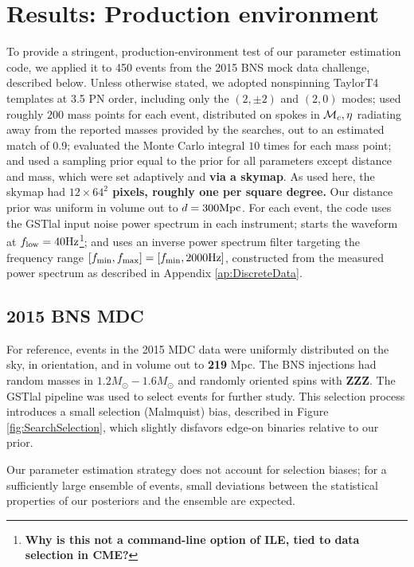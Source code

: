 \documentclass[twocolumn,prd,nofootinbib]{revtex4}
\newcommand\unit[1]{{\rm #1}}
\newcommand\mc{{{\cal M}_c}}
\newcommand\nEventsMDC{450}
\newcommand\gstlal{{\sc GSTlal}}
\begin{document}
\section{Results: Production environment}

To provide a stringent, production-environment test of our parameter estimation code, we applied it to \nEventsMDC{}
events from the 2015 BNS mock data challenge, described below.  
%
Unless otherwise stated, we adopted nonspinning TaylorT4 templates at 3.5 PN order, including only the $(2,\pm 2)$ and
$(2,0)$ modes;  used roughly $200$ mass points for each event, distributed on spokes in $\mc,\eta$ radiating away from the reported
masses  provided by the searches, out to an estimated match of 0.9; 
 evaluated the Monte Carlo integral $10$ times for each mass point; and used a sampling prior equal to the prior for all
 parameters except distance and mass, which were set adaptively and \textbf{via a skymap}.    As used here, the skymap had
 \textbf{$12\times 64^2$ pixels, roughly one per square degree.}  Our distance prior was
 uniform in volume out to $d=300\unit{Mpc}$.  
For each event, the code uses the \gstlal{} input noise power spectrum in each instrument; starts the waveform at $f_{\rm
  low}=40\unit{Hz}$\footnote{ \textbf{Why is this not a command-line option of ILE, tied to data selection in CME?}};
and uses an inverse power spectrum filter targeting the frequency range $[f_{\rm min},f_{\rm max}]=[f_{\rm min},
  2000\unit{Hz}]$, constructed from the measured power spectrum as described in Appendix \ref{ap:DiscreteData}.  

\subsection{2015 BNS MDC}


For reference, events in the 2015 MDC data were uniformly distributed on the sky, in orientation, and in volume out to
\textbf{219} \unit{Mpc}.  The BNS injections had random masses in $1.2 M_\odot-1.6 M_\odot$ and randomly oriented spins with
\textbf{ZZZ}.   The \gstlal{} pipeline was used to select events for further study.  This selection process introduces a
small selection (Malmquist) bias, described in Figure \ref{fig:SearchSelection}, 
which slightly disfavors edge-on binaries relative to our prior.    
%

Our parameter estimation strategy does not account for selection biases; for a sufficiently large ensemble of events,
small deviations between the statistical properties of our posteriors and the ensemble are expected. 
\end{document}
